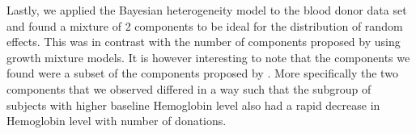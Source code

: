 Lastly, we applied the Bayesian heterogeneity model to the blood donor data set and found a mixture of 2 components to be ideal for the distribution of random effects. This was in contrast with the number of components proposed by \citet{nasserinejad_prevalence_2015} using growth mixture models. It is however interesting to note that the components we found were a subset of the components proposed by \citet{nasserinejad_prevalence_2015}. More specifically the two components that we observed differed in a way such that the subgroup of subjects with higher baseline Hemoglobin level also had a rapid decrease in Hemoglobin level with number of donations.